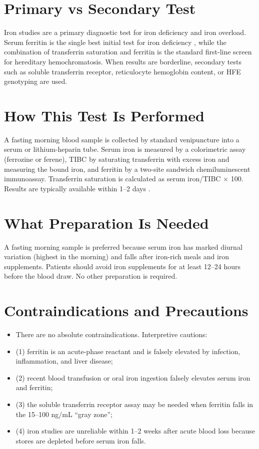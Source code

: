 \section*{Primary vs Secondary Test}
Iron studies are a primary diagnostic test for iron deficiency and iron overload. Serum ferritin is the single best initial test for iron deficiency \cite{guyatt1992laboratory}, while the combination of transferrin saturation and ferritin is the standard first-line screen for hereditary hemochromatosis. When results are borderline, secondary tests such as soluble transferrin receptor, reticulocyte hemoglobin content, or HFE genotyping are used.
\section*{How This Test Is Performed}
A fasting morning blood sample is collected by standard venipuncture into a serum or lithium-heparin tube. Serum iron is measured by a colorimetric assay (ferrozine or ferene), TIBC by saturating transferrin with excess iron and measuring the bound iron, and ferritin by a two-site sandwich chemiluminescent immunoassay. Transferrin saturation is calculated as serum iron/TIBC $\times$ 100. Results are typically available within 1--2 days \cite{tietz2023textbook}.
\section*{What Preparation Is Needed}
A fasting morning sample is preferred because serum iron has marked diurnal variation (highest in the morning) and falls after iron-rich meals and iron supplements. Patients should avoid iron supplements for at least 12--24 hours before the blood draw. No other preparation is required.
\section*{Contraindications and Precautions}
\begin{itemize}
  \item There are no absolute contraindications. Interpretive cautions:
  \item (1) ferritin is an acute-phase reactant and is falsely elevated by infection, inflammation, and liver disease;
  \item (2) recent blood transfusion or oral iron ingestion falsely elevates serum iron and ferritin;
  \item (3) the soluble transferrin receptor assay may be needed when ferritin falls in the 15--100 ng/mL ``gray zone'';
  \item (4) iron studies are unreliable within 1--2 weeks after acute blood loss because stores are depleted before serum iron falls.
\end{itemize}
